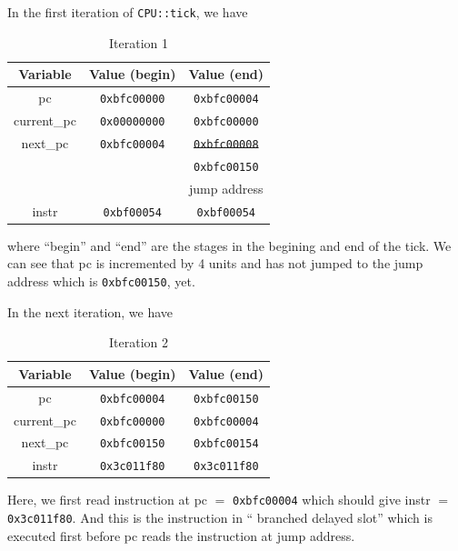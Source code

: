 \documentclass[a4paper]{article}
\newcommand{\code}[1] {\texttt{#1}}
\begin{document}
In the first iteration of \code{CPU::tick}, we have

\begin{table}[h!]
\centering
\begin{tabular}{ |c|c|c| }
  \hline
  Variable     & Value (begin)     & Value (end) \\ \hline
  pc           & \code{0xbfc00000} & \code{0xbfc00004} \\ \hline
  current\_pc  & \code{0x00000000} & \code{0xbfc00000} \\ \hline
  next\_pc     & \code{0xbfc00004} & \sout{\code{0xbfc00008}} \\
               &                   & \code{0xbfc00150} \\
               &                   & jump address \\ \hline
  instr        & \code{0xbf00054}  & \code{0xbf00054}  \\ \hline
\end{tabular}
\caption{Iteration 1}
\end{table}

where ``begin'' and ``end'' are the stages in the begining and end of the
tick.  We can see that pc is incremented by 4 units and has not jumped
to the jump address which is \code{0xbfc00150}, yet.

In the next iteration, we have
\begin{table}[h!]
\centering
\begin{tabular}{ |c|c|c| }
  \hline
  Variable     & Value (begin)     & Value (end) \\ \hline
  pc           & \code{0xbfc00004} & \code{0xbfc00150} \\ \hline
  current\_pc  & \code{0xbfc00000} & \code{0xbfc00004} \\ \hline
  next\_pc     & \code{0xbfc00150} & \code{0xbfc00154} \\ \hline
  instr        & \code{0x3c011f80} & \code{0x3c011f80}  \\ \hline
\end{tabular}
\caption{Iteration 2}
\end{table}

Here, we first read instruction at pc $=$ \code{0xbfc00004} which should
give instr $=$ \code{0x3c011f80}.  And this is the instruction in `` branched
delayed slot'' which is executed first before pc reads the instruction at
jump address.

\newpage

\listoftables
\listoffigures
\end{document}

